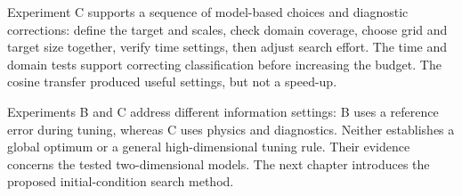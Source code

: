 Experiment C supports a sequence of model-based choices and diagnostic corrections: define the target and scales, check domain coverage, choose grid and target size together, verify time settings, then adjust search effort. The time and domain tests support correcting classification before increasing the budget. The cosine transfer produced useful settings, but not a speed-up.

Experiments B and C address different information settings: B uses a reference error during tuning, whereas C uses physics and diagnostics. Neither establishes a global optimum or a general high-dimensional tuning rule. Their evidence concerns the tested two-dimensional models. The next chapter introduces the proposed initial-condition search method.
